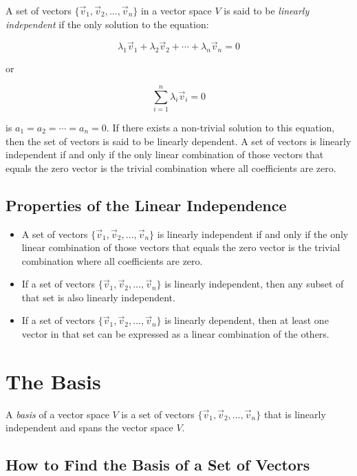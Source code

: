 A set of vectors \(\{\vec{v}_1, \vec{v}_2, \dots, \vec{v}_n\}\) in a vector space \(V\) is said to
be \emph{linearly independent} if the only solution to the equation:

\[
	\lambda_1\vec{v}_1 + \lambda_2\vec{v}_2 + \cdots + \lambda_n\vec{v}_n = 0
\]

or

\[
	\sum_{i=1}^n \lambda_i \vec{v}_i = 0
\]

is \(a_1 = a_2 = \cdots = a_n = 0\). If there exists a non-trivial solution to this equation, then the set of vectors is said to be linearly dependent.
A set of vectors is linearly independent if and only if the only linear combination of those vectors that equals the zero vector
is the trivial combination where all coefficients are zero.

\subsection{Properties of the Linear Independence}

\begin{itemize}

	\item A set of vectors \(\{\vec{v}_1, \vec{v}_2, \ldots, \vec{v}_n\}\) is linearly independent
	      if and only if the only linear combination of those vectors that equals the zero vector is
	      the trivial combination where all coefficients are zero.

	\item If a set of vectors \(\{\vec{v}_1, \vec{v}_2, \ldots, \vec{v}_n\}\) is linearly independent,
	      then any subset of that set is also linearly independent.

	\item If a set of vectors \(\{\vec{v}_1, \vec{v}_2, \ldots, \vec{v}_n\}\) is linearly dependent,
	      then at least one vector in that set can be expressed as a linear combination of the others.

\end{itemize}

\section{The Basis}

A \emph{basis} of a vector space \(V\) is a set of vectors 	\(\{\vec{v}_1, \vec{v}_2, \ldots, \vec{v}_n\}\) that is linearly independent and
spans the vector space \(V\).

\subsection{How to Find the Basis of a Set of Vectors}

